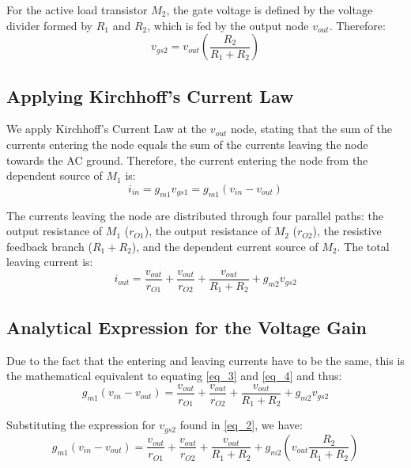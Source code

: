 \documentclass[12pt,a4paper]{article}
\begin{document}
For the active load transistor $M_{2}$, the gate voltage is defined by the voltage divider formed by $R_1$ and $R_2$, which is fed by the output node $v_{out}$. Therefore:
\begin{equation}
    v_{gs2} = v_{out} \left(\frac{R_{2}}{R_{1} + R_{2}}\right)
    \label{eq_2}
\end{equation}


\subsection{Applying Kirchhoff's Current Law}
We apply Kirchhoff's Current Law at the $v_{out}$ node, stating that the sum of the currents entering the node equals the sum of the currents leaving the node towards the AC ground. Therefore, the current entering the node from the dependent source of $M_1$ is:
\begin{equation}
    i_{in} = g_{m1}v_{gs1} = g_{m1}(v_{in} - v_{out})
    \label{eq_3}
\end{equation}

The currents leaving the node are distributed through four parallel paths: the output resistance of $M_{1}$ ($r_{O1}$), the output resistance of $M_{2}$ ($r_{O2}$), the resistive feedback branch ($R_{1} + R_{2}$), and the dependent current source of $M_{2}$. The total leaving current is:
\begin{equation}
    i_{out} = \frac{v_{out}}{r_{O1}} + \frac{v_{out}}{r_{O2}} + \frac{v_{out}}{R_{1} + R_{2}} + g_{m2}v_{gs2}
    \label{eq_4}
\end{equation}


\subsection{Analytical Expression for the Voltage Gain}
Due to the fact that the entering and leaving currents have to be the same, this is the mathematical equivalent to equating \autoref{eq_3} and \autoref{eq_4} and thus:
\begin{equation}
    g_{m1}(v_{in} - v_{out}) = \frac{v_{out}}{r_{O1}} + \frac{v_{out}}{r_{O2}} + \frac{v_{out}}{R_{1} + R_{2}} + g_{m2}v_{gs2}
    \label{eq_5}
\end{equation}

Substituting the expression for $v_{gs2}$ found in \autoref{eq_2}, we have:
\begin{equation}
    g_{m1}(v_{in} - v_{out}) = \frac{v_{out}}{r_{O1}} + \frac{v_{out}}{r_{O2}} + \frac{v_{out}}{R_{1} + R_{2}} + g_{m2} \left(v_{out}\frac{R_{2}}{R_{1} + R_{2}}\right)
    \label{eq_6}
\end{equation}
\end{document}
